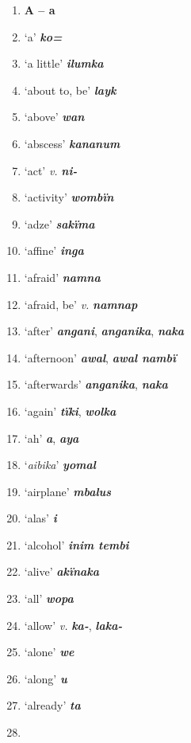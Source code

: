 \begin{enumerate}[noitemsep, label={}, align=left, widest=190, labelsep=1ex,leftmargin=*,itemindent=-10pt]

\item
\noindent \textbf{A – a}\\ \item

‘a’ \textbf{\textit{ko=}} \item
‘a little’ \textbf{\textit{ilumka}} \item
‘about to, be’ \textbf{\textit{layk}} \item
‘above’ \textbf{\textit{wan}} \item
‘abscess’ \textbf{\textit{kananum}} \item
‘act’ \textit{v.} \textbf{\textit{ni-}} \item
‘activity’ \textbf{\textit{wombïn}} \item
‘adze’ \textbf{\textit{sakïma}} \item
‘affine’ \textbf{\textit{inga}} \item
‘afraid’ \textbf{\textit{namna}} \item
‘afraid, be’ \textit{v.} \textbf{\textit{namnap}} \item
‘after’ \textbf{\textit{angani}}, \textbf{\textit{anganika}}, \textbf{\textit{naka}} \item
‘afternoon’ \textbf{\textit{awal}}, \textbf{\textit{awal nambï}} \item
‘afterwards’ \textbf{\textit{anganika}}, \textbf{\textit{naka}} \item
‘again’ \textbf{\textit{tïki}}, \textbf{\textit{wolka}} \item
‘ah’ \textbf{\textit{a}}, \textbf{\textit{aya}} \item
‘\textit{aibika}’ \textbf{\textit{yomal}} \item
‘airplane’ \textbf{\textit{mbalus}} \item
‘alas’ \textbf{\textit{i}} \item
‘alcohol’ \textbf{\textit{inim tembi}} \item
‘alive’ \textbf{\textit{akïnaka}} \item
‘all’ \textbf{\textit{wopa}} \item
‘allow’ \textit{v.} \textbf{\textit{ka-}}, \textbf{\textit{laka-}} \item
‘alone’ \textbf{\textit{we}} \item
‘along’ \textbf{\textit{u}} \item
‘already’ \textbf{\textit{ta}} \item

\end{enumerate}

